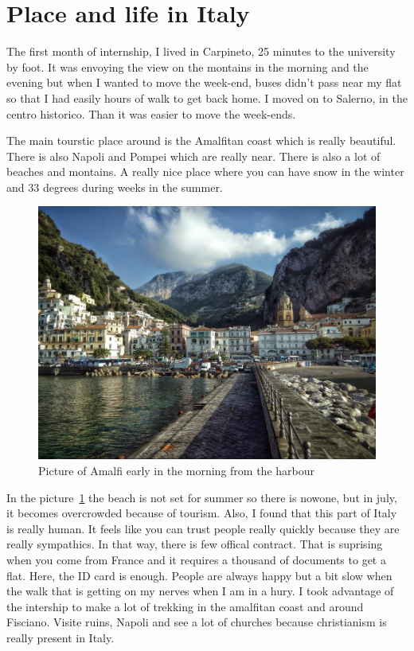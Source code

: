  \section{Place and life in Italy}
 
 \par The first month of internship, I lived in Carpineto, 25 minutes to the university by foot. It was envoying the view on the montains in the morning and the evening but when I wanted to move the week-end, buses didn't pass near my flat so that I had easily hours of walk to get back home. I moved on to Salerno, in the centro historico. Than it was easier to move the week-ends. 
 \par The main tourstic place around is the Amalfitan coast which is really beautiful. There is also Napoli and Pompei which are really near. There is also a lot of beaches and montains. A really nice place where you can have snow in the winter and 33 degrees during weeks in the summer. 
  \begin{figure}[h]
 \begin{center}
	 \includegraphics[width=12cm]{images_not_compressed/amalfi.jpg}
		\caption{Picture of Amalfi early in the morning from the harbour}
		\label{amalfi}
	 \end{center}
 \end{figure}

 \par In the picture~\ref{amalfi} the beach is not set for summer so there is nowone, but in july, it becomes overcrowded because of tourism. Also, I found that this part of Italy is really human. It feels like you can trust people really quickly because they are really sympathics. In that way, there is few offical contract. That is suprising when you come from France and it requires a thousand of documents to get a flat. Here, the ID card is enough. People are always happy but a bit slow when the walk that is getting on my nerves when I am in a hury.
 I took advantage of the intership to make a lot of trekking in the amalfitan coast and around Fisciano. Visite ruins, Napoli and see a lot of churches because christianism is really present in Italy.
